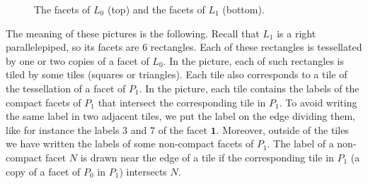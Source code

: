 \documentclass{amsart}
\theoremstyle{definition}
\theoremstyle{remark}
\begin{document}
\begin{figure}

    \caption{The facets of $L_0$ (top) and the facets of $L_1$ (bottom).}\label{f2}
\end{figure}
The meaning of these pictures is the following. Recall that $L_1$ is a right parallelepiped, so its facets are $6$ rectangles. Each of these rectangles is tessellated by one or two copies of a facet of $L_0$. In the picture, each of such rectangles is tiled by some tiles (squares or triangles). Each tile also corresponds to a tile of the tessellation of a facet of $P_1$. In the picture, each tile contains the labels of the compact facets of $P_1$ that intersect the corresponding tile in $P_1$. To avoid writing the same label in two adjacent tiles, we put the label on the edge dividing them, like for instance the labels $3$ and $7$ of the facet $\textbf{1}$. Moreover, outside of the tiles we have written the labels of some non-compact facets of $P_1$. The label of a non-compact facet $N$ is drawn near the edge of a tile if the corresponding tile in $P_1$ (a copy of a facet of $P_0$ in $P_1$) intersects $N$.

\end{document}
